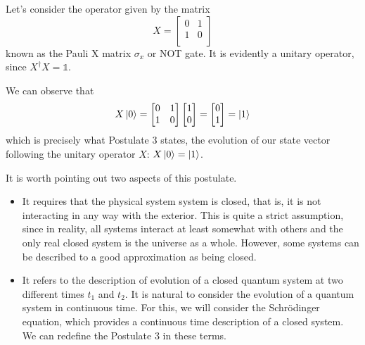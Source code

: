 \begin{ejemplo}
    Let's consider the operator given by the matrix 
    \begin{equation}
        X = \begin{bmatrix}
        0&1\\
        1&0\\
        \end{bmatrix} 
    \end{equation}
    known as the Pauli X matrix $\sigma_x$ or NOT gate. It is evidently a unitary operator, since $X^\dag X = \mathbb{1}$. 

    We can observe that 
    \begin{equation}
        X \ket{0}= \begin{bmatrix}
        0&1\\
        1&0\\
        \end{bmatrix} 
        \begin{bmatrix}
        1\\
        0\\
        \end{bmatrix} =
        \begin{bmatrix}
        0\\
        1\\
        \end{bmatrix} = \ket{1}
    \end{equation}
    which is precisely what Postulate 3 states,  the evolution
    of our state vector following the unitary operator $X$: $X \ket{0} = \ket{1}$. 
\end{ejemplo}

It is worth pointing out two aspects of this postulate.
\begin{itemize}
    \item It requires that the physical system system is closed, that is, it is not interacting in any way with the exterior. This is quite a strict assumption, since in reality, all systems interact at least somewhat with others and the only real closed system is the universe as a whole. However, some systems can be described to a good approximation as being closed.

    \item It refers to the description of evolution of a closed quantum system at two different times $t_1$ and $t_2$. It is natural to consider the evolution of a quantum system in continuous time. For this, we will consider the Schrödinger equation, which provides a continuous time description of a closed system. We can redefine the Postulate 3 in these terms.
\end{itemize}

